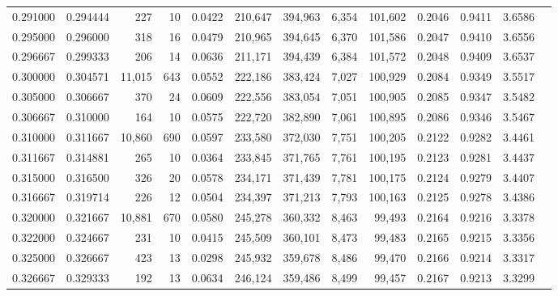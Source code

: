\begin{tabular}{rrrrrrrrrrrrr}
0.291000 & 0.294444 &    227 &    10 &                                     0.0422 & 210,647 & 394,963 &   6,354 & 101,602 & 0.2046 & 0.9411 & 3.6586 \\
0.295000 & 0.296000 &    318 &    16 &                                     0.0479 & 210,965 & 394,645 &   6,370 & 101,586 & 0.2047 & 0.9410 & 3.6556 \\
0.296667 & 0.299333 &    206 &    14 &                                     0.0636 & 211,171 & 394,439 &   6,384 & 101,572 & 0.2048 & 0.9409 & 3.6537 \\
0.300000 & 0.304571 & 11,015 &   643 &                                     0.0552 & 222,186 & 383,424 &   7,027 & 100,929 & 0.2084 & 0.9349 & 3.5517 \\
0.305000 & 0.306667 &    370 &    24 &                                     0.0609 & 222,556 & 383,054 &   7,051 & 100,905 & 0.2085 & 0.9347 & 3.5482 \\
0.306667 & 0.310000 &    164 &    10 &                                     0.0575 & 222,720 & 382,890 &   7,061 & 100,895 & 0.2086 & 0.9346 & 3.5467 \\
0.310000 & 0.311667 & 10,860 &   690 &                                     0.0597 & 233,580 & 372,030 &   7,751 & 100,205 & 0.2122 & 0.9282 & 3.4461 \\
0.311667 & 0.314881 &    265 &    10 &                                     0.0364 & 233,845 & 371,765 &   7,761 & 100,195 & 0.2123 & 0.9281 & 3.4437 \\
0.315000 & 0.316500 &    326 &    20 &                                     0.0578 & 234,171 & 371,439 &   7,781 & 100,175 & 0.2124 & 0.9279 & 3.4407 \\
0.316667 & 0.319714 &    226 &    12 &                                     0.0504 & 234,397 & 371,213 &   7,793 & 100,163 & 0.2125 & 0.9278 & 3.4386 \\
0.320000 & 0.321667 & 10,881 &   670 &                                     0.0580 & 245,278 & 360,332 &   8,463 &  99,493 & 0.2164 & 0.9216 & 3.3378 \\
0.322000 & 0.324667 &    231 &    10 &                                     0.0415 & 245,509 & 360,101 &   8,473 &  99,483 & 0.2165 & 0.9215 & 3.3356 \\
0.325000 & 0.326667 &    423 &    13 &                                     0.0298 & 245,932 & 359,678 &   8,486 &  99,470 & 0.2166 & 0.9214 & 3.3317 \\
0.326667 & 0.329333 &    192 &    13 &                                     0.0634 & 246,124 & 359,486 &   8,499 &  99,457 & 0.2167 & 0.9213 & 3.3299 \\

\end{tabular}

